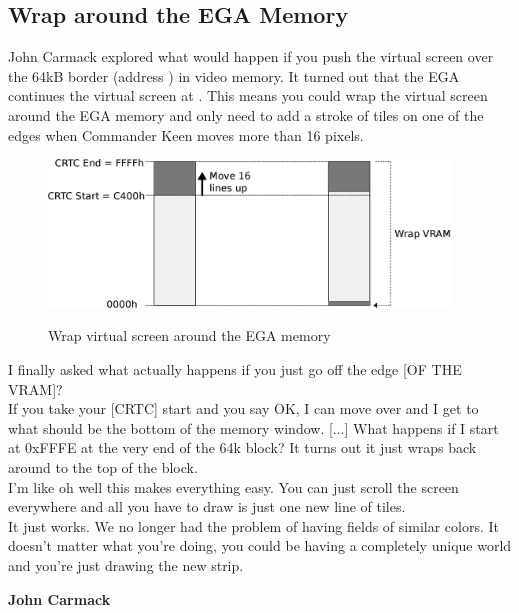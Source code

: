 \documentclass[book.tex]{subfiles}
\begin{document}
\subsection{Wrap around the EGA Memory}
\label{section:wrap_ega_memory}
\label{section:optimize_tile}
John Carmack explored what would happen if you push the virtual screen over the 64kB border (address ) in video memory. It turned out that the EGA continues the virtual screen at . This means you could wrap the virtual screen around  the EGA memory and only need to add a stroke of tiles on one of the edges when Commander Keen moves more than 16 pixels.\\
\par
\begin{figure}[H]
  \centering
  \includegraphics[width=0.95\textwidth]{imgs/drawings/ega_wrapping.eps}
  \label{fig:ega_wrapping}
  \caption{Wrap virtual screen around the EGA memory}
\end{figure}
 
\par
\begin{fancyquotes}
I finally asked what actually happens if you just go off the edge [OF THE VRAM]?\\

If you take your [CRTC] start and you say OK, I can move over and I get to what should be the bottom of the memory window. [...] What happens if I start at 0xFFFE at the very end of the 64k block? It turns out it just wraps back around to the top of the block.\\

I'm like oh well this makes everything easy. You can just scroll the screen everywhere and all you have to draw is just one new line of tiles.\\

It just works. We no longer had the problem of having fields of similar colors. It doesn't matter what you're doing, you could be having a completely unique world and you're just drawing the new strip.\\
\par
\textbf{John Carmack\protect\footnotemark}
\end{fancyquotes}\\
\addtocounter{footnote}{-1}
\end{document}
